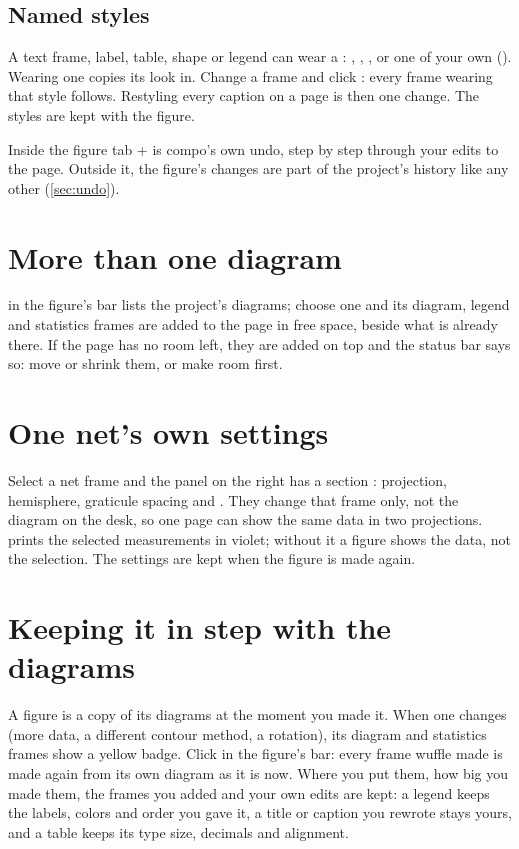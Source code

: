 \subsection{Named styles}

A text frame, label, table, shape or legend can wear a : , ,
, or one of your own (). Wearing one copies its look in. Change a
frame and click : every frame wearing that style follows. Restyling every caption on a
page is then one change. The styles are kept with the figure.

Inside the figure tab + is compo's own undo, step by step through your edits to the
page. Outside it, the figure's changes are part of the project's history like any other (\cref{sec:undo}).

\section{More than one diagram}

 in the figure's bar lists the project's diagrams; choose one and its diagram, legend and
statistics frames are added to the page in free space, beside what is already there. If the page has no
room left, they are added on top and the status bar says so: move or shrink them, or make room first.

\section{One net's own settings}

Select a net frame and the panel on the right has a section : projection, hemisphere,
graticule spacing and . They change that frame only, not the diagram on the desk, so one
page can show the same data in two projections.  prints the selected measurements in
violet; without it a figure shows the data, not the selection. The settings are kept when the figure is
made again.

\section{Keeping it in step with the diagrams}\label{sec:figure-refresh}

A figure is a copy of its diagrams at the moment you made it. When one changes (more data, a different
contour method, a rotation), its diagram and statistics frames show a yellow  badge. Click
 in the figure's bar: every frame wuffle made is made again from its own diagram as
it is now. Where you put them, how big you made them, the frames you added and your own edits are kept: a
legend keeps the labels, colors and order you gave it, a title or caption you rewrote stays yours, and a
table keeps its type size, decimals and alignment.

